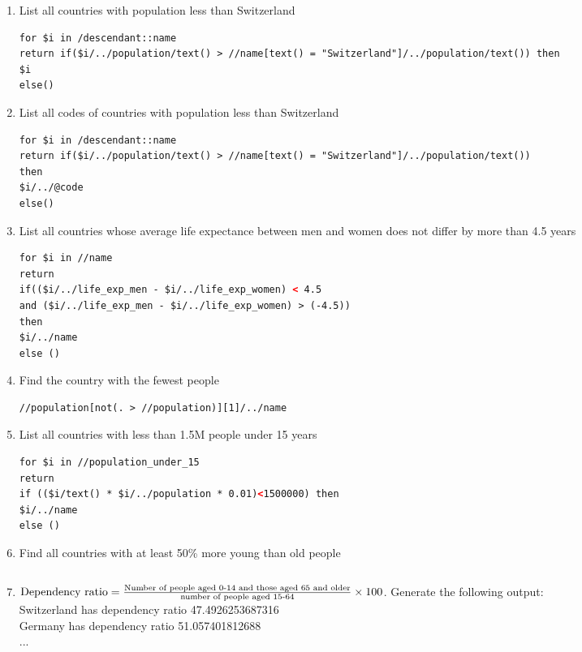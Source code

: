 \begin{enumerate}
\item List all countries with population less than Switzerland
\begin{lstlisting}[language=XML]
for $i in /descendant::name
return if($i/../population/text() > //name[text() = "Switzerland"]/../population/text()) then
$i
else()
\end{lstlisting}

\item List all codes of countries with population less than Switzerland
\begin{lstlisting}[language=XML]
for $i in /descendant::name
return if($i/../population/text() > //name[text() = "Switzerland"]/../population/text())
then
$i/../@code
else()
\end{lstlisting}

\item List all countries whose average life expectance between men and women does not differ by more than 4.5 years
\begin{lstlisting}[language=XML]
for $i in //name
return
if(($i/../life_exp_men - $i/../life_exp_women) < 4.5
and ($i/../life_exp_men - $i/../life_exp_women) > (-4.5))
then
$i/../name
else ()
\end{lstlisting}

\item Find the country with the fewest people
\begin{lstlisting}[language=XML]
//population[not(. > //population)][1]/../name
\end{lstlisting}

\item List all countries with less than 1.5M people under 15 years
\begin{lstlisting}[language=XML]
for $i in //population_under_15
return
if (($i/text() * $i/../population * 0.01)<1500000) then
$i/../name
else ()
\end{lstlisting}

\item Find all countries with at least 50\% more young than old people
\begin{lstlisting}[language=XML]
\end{lstlisting}

\item $\textnormal{Dependency ratio}=\frac{\textnormal{Number of people aged 0-14 and those aged 65 and older}}{\textnormal{number of people aged 15-64}}\times 100$. Generate the following output:\\
Switzerland has dependency ratio 47.4926253687316 \\
Germany has dependency ratio 51.057401812688\\...
\begin{lstlisting}[language=XML]
\end{lstlisting}


\end{enumerate}
